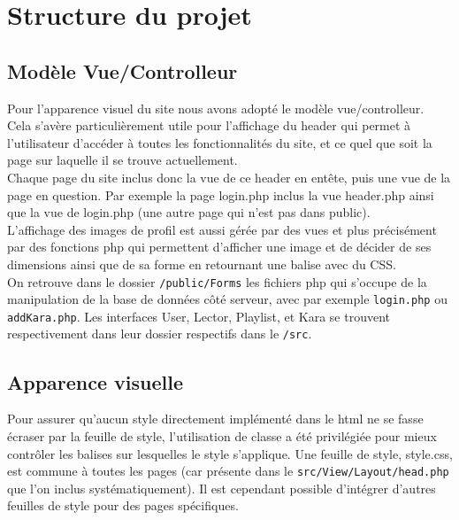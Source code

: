\section{Structure du projet}
\subsection{Modèle Vue/Controlleur}
Pour l'apparence visuel du site nous avons adopté le modèle vue/controlleur. \\
Cela s'avère particulièrement utile pour l'affichage du header qui permet à l'utilisateur d'accéder à toutes les fonctionnalités du site, et ce quel que soit la page sur laquelle il se trouve actuellement.\\
Chaque page du site inclus donc la vue de ce header en entête, puis une vue de la page en question.
Par exemple la page login.php inclus la vue header.php ainsi que la vue de login.php (une autre page qui n'est pas dans public).\\
L'affichage des images de profil est aussi gérée par des vues et plus précisément par des fonctions php qui permettent d'afficher une image et de décider de ses dimensions ainsi que de sa forme en retournant une balise avec du CSS.\\
On retrouve dans le dossier \texttt{/public/Forms} les fichiers php qui s'occupe de la manipulation de la base de données côté serveur, avec par exemple \texttt{login.php} ou \texttt{addKara.php}.\newline
Les interfaces User, Lector, Playlist, et Kara se trouvent respectivement dans leur dossier respectifs dans le \texttt{/src}.


\subsection{Apparence visuelle}
Pour assurer qu'aucun style directement implémenté dans le html ne se fasse écraser par la feuille de style, l'utilisation de classe a été privilégiée pour mieux contrôler les balises sur lesquelles le style s'applique. Une feuille de style, style.css, est commune à toutes les pages (car présente dans le \texttt{src/View/Layout/head.php} que l'on inclus systématiquement). Il est cependant possible d'intégrer d'autres feuilles de style pour des pages spécifiques.

